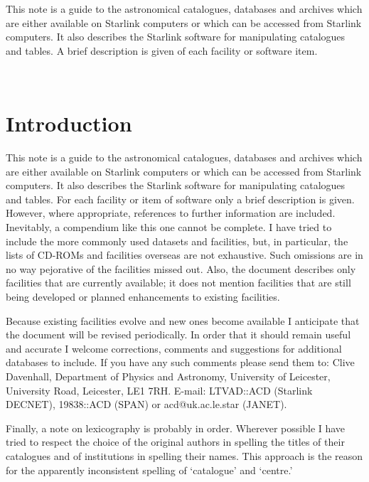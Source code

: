 \documentclass[twoside,11pt]{article}
\newcommand{\stardocinitials}  {SUN}
\newcommand{\stardocnumber}    {162.1}
\newcommand{\stardocabstract}  {
This note is a guide to the astronomical catalogues, databases and 
archives which are either available on Starlink computers or which can 
be accessed from Starlink computers. It also describes the Starlink 
software for manipulating catalogues and tables.
A brief description is given of each facility or software item.
}
\newcommand{\stardocname}{\stardocinitials /\stardocnumber}
\newenvironment{latexonly}{}{}
\newcommand{\xlabel}[1]{}
\renewcommand{\thepage}{\roman{page}}
\begin{document}
\stardocabstract
\newpage
\begin{latexonly}
   \setlength{\parskip}{0mm}
   \tableofcontents
   \setlength{\parskip}{\medskipamount}
   \markright{\stardocname}
\end{latexonly}
\newpage
~
\newpage
\renewcommand{\thepage}{\arabic{page}}
\setcounter{page}{1}

\section{Introduction\xlabel{introduction}}

This note is a guide to the astronomical catalogues, databases and 
archives which are either available on Starlink computers or which can 
be accessed from Starlink computers. It also describes the Starlink 
software for manipulating catalogues and tables. For each facility or 
item of software only a brief description is given. However, where 
appropriate, references to further information are included. Inevitably,
a compendium like this one cannot be complete. I have tried to include 
the more commonly used datasets and facilities, but, in particular, the 
lists of CD-ROMs and facilities overseas are not exhaustive. Such 
omissions are in no way pejorative of the facilities missed out. Also,
the document describes only facilities that are currently available; it 
does not mention facilities that are still being developed or planned 
enhancements to existing facilities.

Because existing facilities evolve and new ones become available I 
anticipate that the document will be revised periodically. In order that
it should remain useful and accurate I welcome corrections, comments and
suggestions for additional databases to include. If you have any such 
comments please send them to: Clive Davenhall, Department of Physics and
Astronomy, University of Leicester, University Road, Leicester, LE1 7RH.
E-mail: LTVAD::ACD (Starlink DECNET), 19838::ACD (SPAN) or 
acd@uk.ac.le.star (JANET).

Finally, a note on lexicography is probably in order. Wherever possible
I have tried to respect the choice of the original authors in spelling
the titles of their catalogues and of institutions in spelling their 
names. This approach is the reason for the apparently inconsistent 
spelling of `catalogue' and `centre.'
\end{document}
